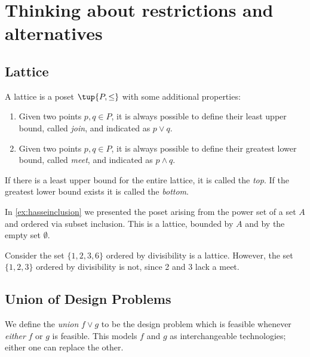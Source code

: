 \section{Thinking about restrictions and alternatives}
\subsection{Lattice}
\begin{definition}[Lattice]
\label{def:lattice}
A lattice is a poset $\tup{P, \leq}$ with some additional properties:
\begin{enumerate}
    \item Given two points $p, q \in P$, it is always possible to define their least upper bound, called \emph{join}, and indicated as $p \vee q$.
    \item Given two points $p, q \in P$, it is always possible to define their greatest lower bound, called \emph{meet}, and indicated as $p \wedge q$.
\end{enumerate}
\end{definition}

If there is a least upper bound for the entire lattice, it is called
the \emph{top}. If the greatest lower bound exists it is called the \emph{bottom}.

\begin{example}
    In \cref{ex:hasseinclusion} we presented the poset arising from the power set of a set $A$ and ordered via subset inclusion. This is a lattice, bounded by $A$ and by the empty set $\emptyset$. 
\end{example}

\begin{example}
Consider the set $\{1,2,3,6\}$ ordered by divisibility is a lattice. However, the set $\{1,2,3\}$ ordered by divisibility is not, since 2 and 3 lack a meet.
\begin{center}
\end{center}
\end{example}
\subsection{Union of Design Problems}

We define the \emph{union} $f \vee g$ to be the design problem which is feasible whenever \emph{either} $f$ or $g$ is feasible. This models $f$ and $g$ as interchangeable technologies; either one can replace the other.


